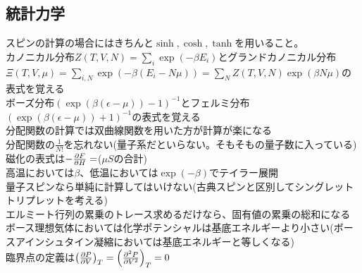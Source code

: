 \documentclass{ltjsarticle}
\begin{document}
  \subsection{統計力学}
  スピンの計算の場合にはきちんと$\sinh,\cosh,\tanh$を用いること。\\
  カノニカル分布$Z(T,V,N)=\sum_i \exp(-\beta E_i)$とグランドカノニカル分布$\Xi(T,V,\mu)=\sum_{i,N}\exp(-\beta(E_i-N\mu))=\sum_N Z(T,V,N)\exp(\beta N\mu)$の表式を覚える\\
  ボーズ分布$(\exp(\beta(\epsilon-\mu))-1)^{-1}$とフェルミ分布$(\exp(\beta(\epsilon-\mu))+1)^{-1}$の表式を覚える\\
  分配関数の計算では双曲線関数を用いた方が計算が楽になる\\
  分配関数の$\frac{1}{N!}$を忘れない(量子系だといらない。そもそもの量子数に入っている)\\
  磁化の表式は$-\pdv{F}{H}=$($\mu S$の合計)\\
  高温においては$\beta$、低温においては$\exp(-\beta)$でテイラー展開\\
  量子スピンなら単純に計算してはいけない(古典スピンと区別してシングレットトリプレットを考える)\\
  エルミート行列の累乗のトレース求めるだけなら、固有値の累乗の総和になる\\
  ボース理想気体においては化学ポテンシャルは基底エネルギーより小さい(ボースアインシュタイン凝縮においては基底エネルギーと等しくなる)\\
  臨界点の定義は$\left( \pdv{P}{V} \right)_T=\left( \pdv[2]{P}{V} \right)_T=0 $
\end{document}
